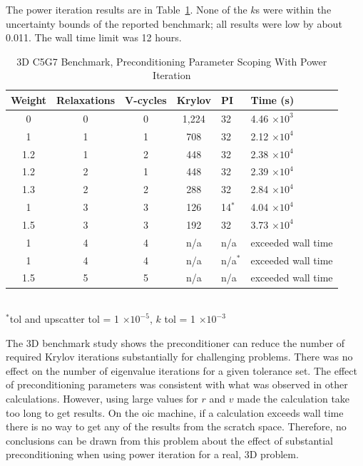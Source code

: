 The power iteration results are in Table~\ref{table:3D c5g7}. None of the $k$s were within the uncertainty bounds of the reported benchmark; all results were low by about 0.011. The wall time limit was 12 hours. 
%
\begin{table}[!h]
\caption{3D C5G7 Benchmark, Preconditioning Parameter Scoping With Power Iteration}
\begin{center}
\begin{tabular}{c c c c l l}
\hline
Weight & Relaxations & V-cycles & Krylov & PI & Time (s) \\[0.5ex]
\hline
0    & 0 & 0 & 1,224 & 32 & 4.46 $\times 10^{3}$ \\
1    & 1 & 1 & 708    & 32 & 2.12 $\times 10^{4}$ \\
1.2 & 1 & 2 & 448    & 32 & 2.38 $\times 10^{4}$ \\
1.2 & 2 & 1 & 448    & 32 & 2.39 $\times 10^{4}$ \\
1.3 & 2 & 2 & 288    & 32 & 2.84 $\times 10^{4}$ \\
1    & 3 & 3 & 126    & 14$^{*}$  & 4.04 $\times 10^{4}$ \\
1.5 & 3 & 3 & 192    & 32 & 3.73 $\times 10^{4}$ \\
1    & 4 & 4 & n/a     & n/a          & exceeded wall time \\
1    & 4 & 4 & n/a     & n/a$^{*}$ & exceeded wall time \\
1.5 & 5 & 5 & n/a     & n/a          & exceeded wall time \\
\hline 
\end{tabular}\\
$^{*}$tol and upscatter tol = 1 $\times 10^{-5}$, $k$ tol = 1 $\times 10^{-3}$
\end{center}
\label{table:3D c5g7}
\end{table}

The 3D benchmark study shows the preconditioner can reduce the number of required Krylov iterations substantially for challenging problems. There was no effect on the number of eigenvalue iterations for a given tolerance set. The effect of preconditioning parameters was consistent with what was observed in other calculations. However, using large values for $r$ and $v$ made the calculation take too long to get results. On the oic machine, if a calculation exceeds wall time there is no way to get any of the results from the scratch space. Therefore, no conclusions can be drawn from this problem about the effect of substantial preconditioning when using power iteration for a real, 3D problem. 

